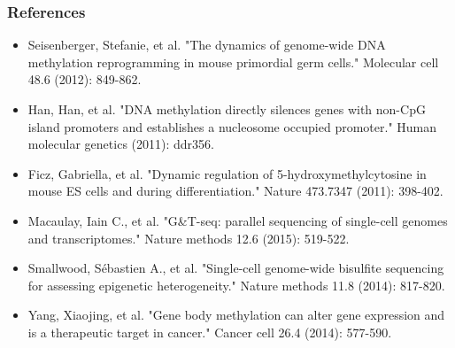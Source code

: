 \documentclass[10pt, compress]{beamer}
\renewcommand{\(}{\begin{columns}}
\renewcommand{\)}{\end{columns}}
\newcommand{\<}[1]{\begin{column}{#1}}
\renewcommand{\>}{\end{column}}
\begin{document}
\begin{frame}[fragile]
	\frametitle{References}
	\footnotesize
	\begin{itemize}
		\item Seisenberger, Stefanie, et al. "The dynamics of genome-wide DNA methylation reprogramming in mouse primordial germ cells." Molecular cell 48.6 (2012): 849-862.
		\item Han, Han, et al. "DNA methylation directly silences genes with non-CpG island promoters and establishes a nucleosome occupied promoter." Human molecular genetics (2011): ddr356.
		\item Ficz, Gabriella, et al. "Dynamic regulation of 5-hydroxymethylcytosine in mouse ES cells and during differentiation." Nature 473.7347 (2011): 398-402. 
		\item Macaulay, Iain C., et al. "G\&T-seq: parallel sequencing of single-cell genomes and transcriptomes." Nature methods 12.6 (2015): 519-522.
		\item Smallwood, Sébastien A., et al. "Single-cell genome-wide bisulfite sequencing for assessing epigenetic heterogeneity." Nature methods 11.8 (2014): 817-820.
		\item Yang, Xiaojing, et al. "Gene body methylation can alter gene expression and is a therapeutic target in cancer." Cancer cell 26.4 (2014): 577-590.
	\end{itemize}
\end{frame}
\end{document}
